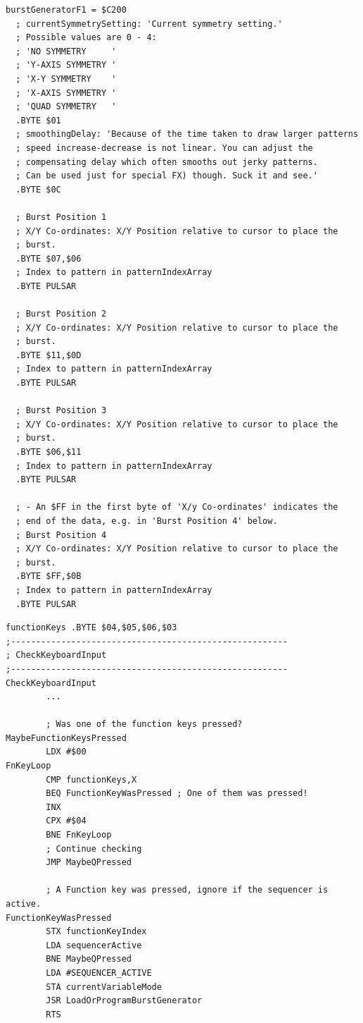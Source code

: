 \begin{lstlisting}[caption=Source code for the F1 Burst.]
burstGeneratorF1 = $C200
  ; currentSymmetrySetting: 'Current symmetry setting.'
  ; Possible values are 0 - 4:
  ; 'NO SYMMETRY     '
  ; 'Y-AXIS SYMMETRY '
  ; 'X-Y SYMMETRY    '
  ; 'X-AXIS SYMMETRY '
  ; 'QUAD SYMMETRY   '
  .BYTE $01
  ; smoothingDelay: 'Because of the time taken to draw larger patterns
  ; speed increase-decrease is not linear. You can adjust the 
  ; compensating delay which often smooths out jerky patterns. 
  ; Can be used just for special FX) though. Suck it and see.'
  .BYTE $0C

  ; Burst Position 1
  ; X/Y Co-ordinates: X/Y Position relative to cursor to place the
  ; burst.
  .BYTE $07,$06
  ; Index to pattern in patternIndexArray
  .BYTE PULSAR

  ; Burst Position 2
  ; X/Y Co-ordinates: X/Y Position relative to cursor to place the
  ; burst.
  .BYTE $11,$0D
  ; Index to pattern in patternIndexArray
  .BYTE PULSAR

  ; Burst Position 3
  ; X/Y Co-ordinates: X/Y Position relative to cursor to place the 
  ; burst.
  .BYTE $06,$11
  ; Index to pattern in patternIndexArray
  .BYTE PULSAR

  ; - An $FF in the first byte of 'X/y Co-ordinates' indicates the
  ; end of the data, e.g. in 'Burst Position 4' below.
  ; Burst Position 4
  ; X/Y Co-ordinates: X/Y Position relative to cursor to place the 
  ; burst.
  .BYTE $FF,$0B
  ; Index to pattern in patternIndexArray
  .BYTE PULSAR

\end{lstlisting}

\clearpage
\begin{lstlisting}
functionKeys .BYTE $04,$05,$06,$03
;-------------------------------------------------------
; CheckKeyboardInput
;-------------------------------------------------------
CheckKeyboardInput   
        ...

        ; Was one of the function keys pressed?
MaybeFunctionKeysPressed   
        LDX #$00
FnKeyLoop   
        CMP functionKeys,X
        BEQ FunctionKeyWasPressed ; One of them was pressed!
        INX 
        CPX #$04
        BNE FnKeyLoop
        ; Continue checking
        JMP MaybeQPressed

        ; A Function key was pressed, ignore if the sequencer is active.
FunctionKeyWasPressed   
        STX functionKeyIndex
        LDA sequencerActive
        BNE MaybeQPressed
        LDA #SEQUENCER_ACTIVE
        STA currentVariableMode
        JSR LoadOrProgramBurstGenerator
        RTS 
\end{lstlisting}
\clearpage

